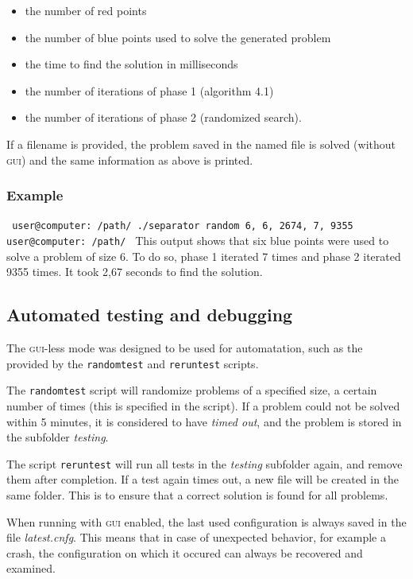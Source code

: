 \documentclass[a4paper,12pt]{article}
\begin{document}
\begin{itemize}
\item
the number of red points
\item
the number of blue points used to solve the generated problem
\item
the time to find the solution in milliseconds
\item
the number of iterations of phase 1 (algorithm 4.1)
\item
the number of iterations of phase 2 (randomized search).
\end{itemize}

If a filename is provided, the problem saved in the named file is solved (without \textsc{gui}) and the same information as above is printed.
\subsubsection*{Example}
\texttt{
user@computer:~/path/\textdollar{} ./separator random 6, 6, 2674, 7, 9355\newline
user@computer:~/path/\textdollar{}
}
\newline \newline
This output shows that six blue points were used to solve a problem of size 6. To do so, phase 1 iterated 7 times and phase 2 iterated 9355 times. It took 2,67 seconds to find the solution.



\subsection{Automated testing and debugging}
The \textsc{gui}-less mode was designed to be used for automatation, such as the provided by the \texttt{randomtest} and \texttt{reruntest} scripts.

The \texttt{randomtest} script will randomize problems of a specified size, a certain number of times (this is specified in the script). If a problem could not be solved within 5 minutes, it is considered to have \emph{timed out}, and the problem is stored in the subfolder \emph{testing}.

The script \texttt{reruntest} will run all tests in the \emph{testing} subfolder again, and remove them after completion. If a test again times out, a new file will be created in the same folder. This is to ensure that a correct solution is found for all problems.

When running with \textsc{gui} enabled, the last used configuration is always saved in the file \emph{latest.cnfg}. This means that in case of unexpected behavior, for example a crash, the configuration on which it occured can always be recovered and examined.
\end{document}
